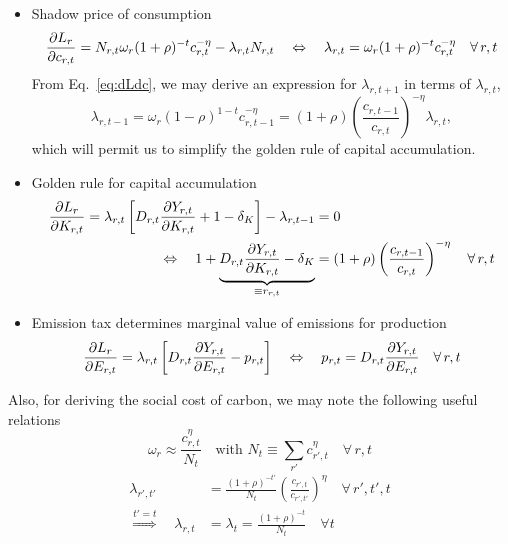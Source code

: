 \documentclass[preprint,3p,authoryear]{elsarticle}
\begin{document}
\begin{itemize}
\item Shadow price of consumption
  \begin{equation}
    \label{eq:dLdc}    \frac{\partial L_r}{\partial c_{r,t}}=N_{r,t}\omega_r(1+\rho)^{-t}c_{r,t}^{-\eta}-\lambda_{r,t}N_{r,t}\quad\Leftrightarrow\quad\lambda_{r,t} = \omega_r(1+\rho)^{-t}c_{r,t}^{-\eta}\quad\forall\,r,t
  \end{equation}
From Eq.~\eqref{eq:dLdc}, we may derive an expression for $\lambda_{r,t+1}$ in terms of $\lambda_{r,t}$,
\begin{equation}
  \label{eq:lambda_tpone} \lambda_{r,t-1}=\omega_r(1-\rho)^{1-t}c_{r,t-1}^{-\eta}=(1+\rho)\left(\frac{c_{r,t-1}}{c_{r,t}}\right)^{-\eta}\lambda_{r,t},
\end{equation}
which will permit us to simplify the golden rule of capital accumulation.
\item Golden rule for capital accumulation
  \begin{align} \frac{\partial L_r}{\partial K_{r,t}}=\lambda_{r,t}\left[D_{r,t}\frac{\partial Y_{r,t}}{\partial K_{r,t}}+1-\delta_K\right]-\lambda_{r,t-1}&= 0\notag\\
    \Leftrightarrow\quad 1+\underbrace{D_{r,t}\frac{\partial Y_{r,t}}{\partial K_{r,t}}-\delta_K}_{\equiv r_{r,t}} &= (1+\rho)\left(\frac{c_{r,t-1}}{c_{r,t}}\right)^{-\eta}\quad\forall\, r,t \label{eq:dLdK}
  \end{align}
\item Emission tax determines marginal value of emissions for production  
  \begin{equation}
    \label{eq:dLdE} \frac{\partial L_r}{\partial E_{r,t}}=\lambda_{r,t}\left[D_{r,t}\frac{\partial Y_{r,t}}{\partial E_{r,t}}-p_{r,t}\right]\quad\Leftrightarrow\quad p_{r,t}=D_{r,t}\frac{\partial Y_{r,t}}{\partial E_{r,t}} \quad\forall\,r,t 
  \end{equation}
\end{itemize}
Also, for deriving the social cost of carbon, we may note the following useful relations 
\begin{equation}
  \label{eq:Negishi}
  \omega_{r}\approx \frac{c_{r,t}^{\eta}}{N_{t}}\quad\text{with }N_t\equiv\sum_{r'}c_{r',t}^{\eta} \quad\forall\,r,t
\end{equation}
\begin{subequations}
  \label{eq:lambda}
\begin{align} \lambda_{r',t'}&=\frac{(1+\rho)^{-t'}}{N_t}\left(\frac{c_{r',t}}{c_{r',t'}}\right)^{\eta}\quad\forall\, r',t',t\label{subeq:delta_rptp}\\
  \overset{t'=t}{\Rightarrow}\quad
  \lambda_{r,t}&=\lambda_{t}=\frac{(1+\rho)^{-t}}{N_t}\quad \forall t\label{subeq:delta_rt}
\end{align}
\end{subequations}
\end{document}
